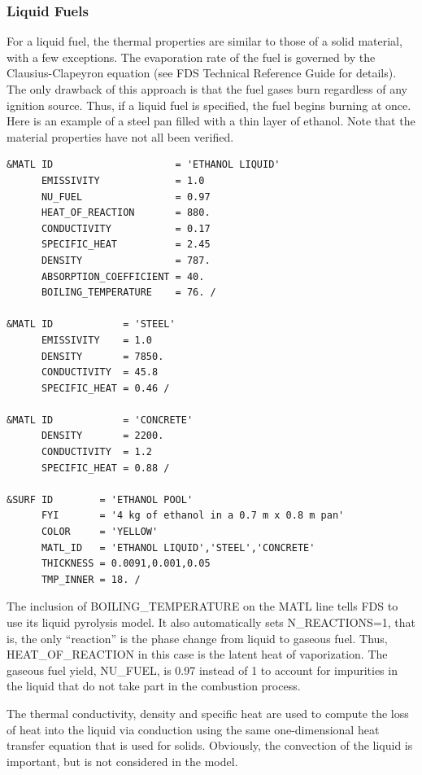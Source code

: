 \documentclass[11pt]{book}
\begin{document}
\subsubsection{Liquid Fuels}

For a liquid fuel, the thermal properties are similar to those of a solid
material, with a few exceptions. The evaporation rate of the fuel
is governed by the Clausius-Clapeyron equation (see FDS Technical Reference
Guide for details). The only drawback of
this approach is that the fuel gases burn regardless of any ignition
source. Thus, if a liquid fuel is specified, the fuel
begins burning at once. Here is an example of a steel pan filled with a thin layer of ethanol. Note that the material
properties have not all been verified.

\footnotesize
\begin{verbatim}
&MATL ID                     = 'ETHANOL LIQUID'
      EMISSIVITY             = 1.0
      NU_FUEL                = 0.97
      HEAT_OF_REACTION       = 880.
      CONDUCTIVITY           = 0.17
      SPECIFIC_HEAT          = 2.45
      DENSITY                = 787.
      ABSORPTION_COEFFICIENT = 40.
      BOILING_TEMPERATURE    = 76. /

&MATL ID            = 'STEEL'
      EMISSIVITY    = 1.0
      DENSITY       = 7850.
      CONDUCTIVITY  = 45.8
      SPECIFIC_HEAT = 0.46 /

&MATL ID            = 'CONCRETE'
      DENSITY       = 2200.
      CONDUCTIVITY  = 1.2
      SPECIFIC_HEAT = 0.88 /

&SURF ID        = 'ETHANOL POOL'
      FYI       = '4 kg of ethanol in a 0.7 m x 0.8 m pan'
      COLOR     = 'YELLOW'
      MATL_ID   = 'ETHANOL LIQUID','STEEL','CONCRETE'
      THICKNESS = 0.0091,0.001,0.05
      TMP_INNER = 18. /
\end{verbatim} \normalsize

\noindent
The inclusion of {\ct BOILING\_TEMPERATURE} on the {\ct MATL} line tells FDS to use its liquid
pyrolysis model. It also automatically sets {\ct N\_REACTIONS=1}, that is, the only ``reaction'' is the
phase change from liquid to gaseous fuel. Thus, {\ct HEAT\_OF\_REACTION} in this case is the latent
heat of vaporization. The gaseous fuel yield, {\ct NU\_FUEL}, is 0.97 instead of 1 to account for
impurities in the liquid that do not take part in the combustion process.

The thermal conductivity, density and specific heat are used
to compute the loss of heat into the liquid via conduction using the
same one-dimensional heat transfer equation that is used for solids. Obviously,
the convection of the liquid is important, but is not considered in
the model.
\end{document}
